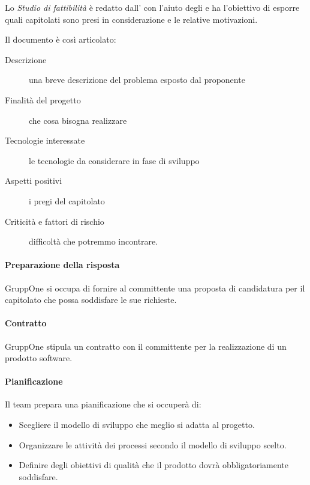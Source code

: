 \documentclass[../../norme-di-progetto.tex]{subfiles}
\begin{document}
Lo \textit{Studio di fattibilità} è redatto dall' con l'aiuto degli  e ha l'obiettivo di esporre quali capitolati sono presi in considerazione e le relative motivazioni.

Il documento è così articolato:
\begin{description}
  \item [Descrizione] una breve descrizione del problema esposto dal proponente
  \item [Finalità del progetto] che cosa bisogna realizzare
  \item [Tecnologie interessate] le tecnologie da considerare in fase di sviluppo
  \item [Aspetti positivi] i pregi del capitolato
  \item [Criticità e fattori di rischio] difficoltà che potremmo incontrare.
\end{description}

\paragraph{Preparazione della risposta}%
\label{subs:preparazione_della_risposta}

GruppOne si occupa di fornire al committente una proposta di candidatura per il capitolato che possa soddisfare le sue richieste.

\paragraph{Contratto}%
\label{par:contratto}

GruppOne stipula un contratto con il committente per la realizzazione di un prodotto software.

\paragraph{Pianificazione}%
\label{par:fornitura/pianificazione}

Il team prepara una pianificazione che si occuperà di:
\begin{itemize}
  \item Scegliere il modello di sviluppo che meglio si adatta al progetto.
  \item Organizzare le attività dei processi secondo il modello di sviluppo scelto.
  \item Definire degli obiettivi di qualità che il prodotto dovrà obbligatoriamente soddisfare.
\end{itemize}
\end{document}
